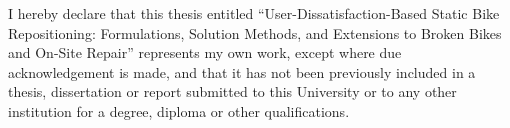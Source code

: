 \begin{declaration}
\addchaptertocentry{\authorshipname} %

I hereby declare that this thesis entitled ``User-Dissatisfaction-Based Static
Bike Repositioning: Formulations, Solution Methods, and Extensions to Broken
Bikes and On-Site Repair'' represents my own work, except where due
acknowledgement is made, and that it has not been previously included in a
thesis, dissertation or report submitted to this University or to any other
institution for a degree, diploma or other qualifications.

\vspace{0.1cm}
\begin{flushright}
\authorname
\end{flushright}
\end{declaration}
